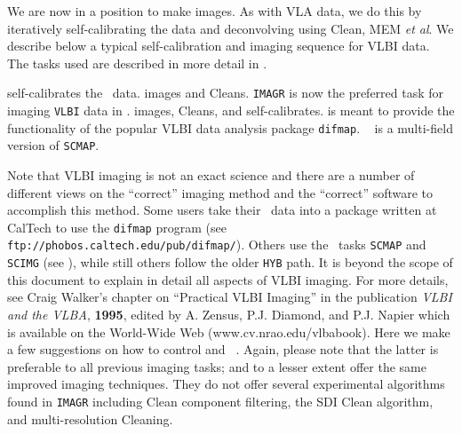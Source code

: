 We are now in a position to make images.  As with VLA data, we do this
by iteratively self-calibrating the data and deconvolving using
Clean, MEM {\it et al}.  We describe below a typical self-calibration
and imaging sequence for VLBI data.  The tasks used are described in
more detail in .

\xben
{} self-calibrates the \uv\ data.
 images and Cleans. {\tt IMAGR} is now
     the preferred task for imaging {\tt VLBI} data in \AIPS\@.
 images, Cleans, and self-calibrates.
     {\tt {}} is meant to provide the functionality of the
     popular VLBI data analysis package {\tt difmap}.  {\tt
     } is a multi-field version of {\tt SCMAP}\@.
\xeen
{}

Note that VLBI imaging is not an exact science and there are a number
of different views on the ``correct'' imaging method and the
``correct'' software to accomplish this method.  Some users take their
\AIPS\ data into a package written at CalTech to use the {\tt difmap}
program (see {\tt ftp://phobos.caltech.edu/pub/difmap/}).  Others use
the \AIPS\ tasks {\tt SCMAP} and {\tt SCIMG} (see ),
while still others follow the older {\tt HYB} path.  It is beyond the
scope of this document to explain in detail all aspects of VLBI
imaging.  For more details, see Craig Walker's chapter on ``Practical
VLBI Imaging'' in the publication {\it VLBI and the VLBA\/}, {\bf 1995},
edited by A. Zensus, P.J. Diamond, and P.J. Napier which is available
on the World-Wide Web (www.cv.nrao.edu/vlbabook).  Here we make a few
suggestions on how to control {\tt {}} and {\tt
{}}\@.  Again, please note that the latter is preferable to
all previous imaging tasks; {\tt {}} and to a lesser extent
{\tt {}} offer the same improved imaging techniques.  They
do not offer several experimental algorithms found in {\tt IMAGR}
including Clean component filtering, the SDI Clean algorithm, and
multi-resolution Cleaning.

